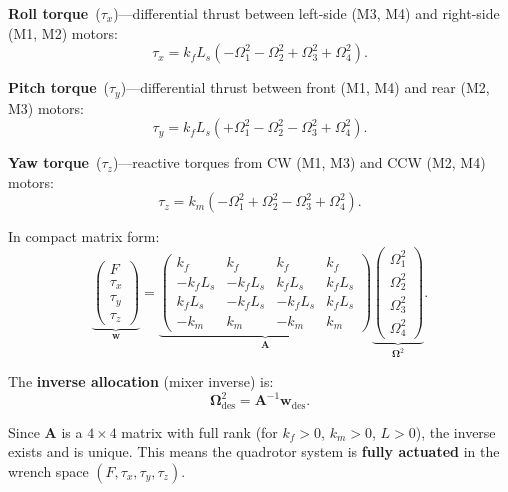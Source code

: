 \documentclass[journal]{IEEEtran}
\newcommand{\w}{\mathbf{w}}
\newcommand{\A}{\mathbf{A}}
\newcommand{\bOmega}{\boldsymbol{\Omega}}
\begin{document}
\textbf{Roll torque}~($\tau_x$)---differential thrust between left-side (M3, M4) and right-side (M1, M2) motors:
\begin{equation}
  \tau_x = k_f L_s (-\Omega_1^2 - \Omega_2^2 + \Omega_3^2 + \Omega_4^2).
  \label{eq:roll_torque}
\end{equation}

\textbf{Pitch torque}~($\tau_y$)---differential thrust between front (M1, M4) and rear (M2, M3) motors:
\begin{equation}
  \tau_y = k_f L_s (+\Omega_1^2 - \Omega_2^2 - \Omega_3^2 + \Omega_4^2).
  \label{eq:pitch_torque}
\end{equation}

\textbf{Yaw torque}~($\tau_z$)---reactive torques from CW (M1, M3) and CCW (M2, M4) motors:
\begin{equation}
  \tau_z = k_m (-\Omega_1^2 + \Omega_2^2 - \Omega_3^2 + \Omega_4^2).
  \label{eq:yaw_torque}
\end{equation}

In compact matrix form:
\begin{equation}
  \underbrace{\begin{pmatrix} F \\ \tau_x \\ \tau_y \\ \tau_z \end{pmatrix}}_{\w}
  =
  \underbrace{\begin{pmatrix}
    k_f      & k_f      & k_f      & k_f      \\
    -k_f L_s & -k_f L_s & k_f L_s  & k_f L_s  \\
    k_f L_s  & -k_f L_s & -k_f L_s & k_f L_s  \\
    -k_m     & k_m      & -k_m     & k_m
  \end{pmatrix}}_{\A}
  \underbrace{\begin{pmatrix} \Omega_1^2 \\ \Omega_2^2 \\ \Omega_3^2 \\ \Omega_4^2 \end{pmatrix}}_{\bOmega^2}.
  \label{eq:allocation}
\end{equation}

The \textbf{inverse allocation} (mixer inverse) is:
\begin{equation}
  \bOmega_{\text{des}}^2 = \A^{-1} \w_{\text{des}}.
  \label{eq:inverse_allocation}
\end{equation}

Since $\A$ is a $4 \times 4$ matrix with full rank (for $k_f > 0$, $k_m > 0$, $L > 0$), the inverse exists and is unique. This means the quadrotor system is \textbf{fully actuated} in the wrench space $(F, \tau_x, \tau_y, \tau_z)$.
\end{document}
